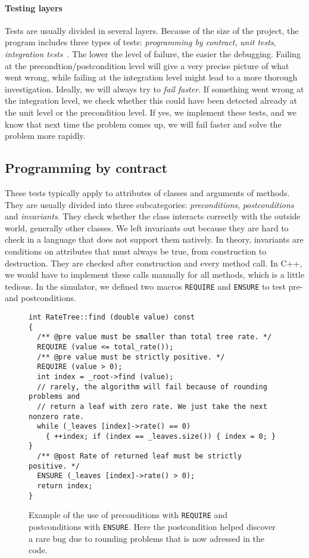 \paragraph{Testing layers} Tests are usually divided in several layers. Because of the size of the project, the program includes three types of tests: \emph{programming by contract}, \emph{unit tests}, \emph{integration tests}~. The lower the level of failure, the easier the debugging. Failing at the precondtion/postcondition level will give a very precise picture of what went wrong, while failing at the integration level might lead to a more thorough investigation. Ideally, we will always try to \emph{fail faster}. If something went wrong at the integration level, we check whether this could have been detected already at the unit level or the precondition level. If yes, we implement these tests, and we know that next time the problem comes up, we will fail faster and solve the problem more rapidly.


\subsection{Programming by contract} 

These tests typically apply to attributes of classes and arguments of methods. They are usually divided into three subcategories: \emph{preconditions}, \emph{postconditions} and \emph{invariants}. They check whether the class interacts correctly with the outside world, generally other classes. We left invariants out because they are hard to check in a language that does not support them natively. In theory, invariants are conditions on attributes that must always be true, from construction to destruction. They are checked after construction and every method call. In C++, we would have to implement these calls manually for all methods, which is a little tedious. In the simulator, we defined two macros \texttt{REQUIRE} and \texttt{ENSURE} to test pre- and postconditions.

\begin{figure}[!h]
  \centering
\begin{verbatim}
int RateTree::find (double value) const
{
  /** @pre value must be smaller than total tree rate. */
  REQUIRE (value <= total_rate());
  /** @pre value must be strictly positive. */
  REQUIRE (value > 0);
  int index = _root->find (value);
  // rarely, the algorithm will fail because of rounding problems and 
  // return a leaf with zero rate. We just take the next nonzero rate.
  while (_leaves [index]->rate() == 0) 
    { ++index; if (index == _leaves.size()) { index = 0; } }
  /** @post Rate of returned leaf must be strictly positive. */
  ENSURE (_leaves [index]->rate() > 0);
  return index;
}
\end{verbatim}
\caption{Example of the use of preconditions with \texttt{REQUIRE} and postconditions with \texttt{ENSURE}. Here the postcondition helped discover a rare bug due to rounding problems that is now adressed in the code.}
\label{fig:prepostconditions}
\end{figure}

